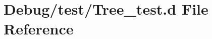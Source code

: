 \hypertarget{_tree__test_8d}{}\section{Debug/test/\+Tree\+\_\+test.d File Reference}
\label{_tree__test_8d}

